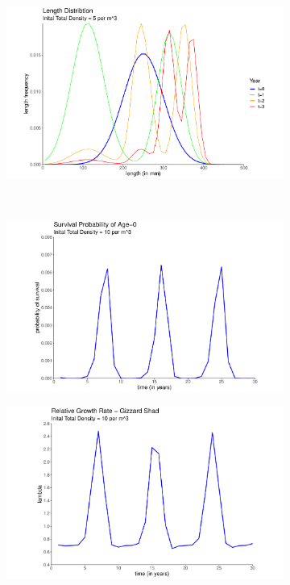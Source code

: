 \documentclass[11pt,oneside]{amsart}
\theoremstyle{definition}
\begin{document}
\begin{figure}
\begin{subfigure}[b]{.3\textwidth}
     \caption{}
\label{}
\end{subfigure}
\begin{subfigure}[b]{.3\textwidth}
   \includegraphics[width=\textwidth]{figures/Figure4f.pdf}
     \caption{}
\label{}  
\end{subfigure} \\
\begin{subfigure}[b]{.3\textwidth}
  \includegraphics[width=\textwidth]{figures/Figure4g.pdf}
   \caption{}
  \label{}
\end{subfigure}
\begin{subfigure}[b]{.3\textwidth}
   \includegraphics[width=\textwidth]{figures/Figure4h.pdf}

\end{subfigure}
\end{figure}
\end{document}
